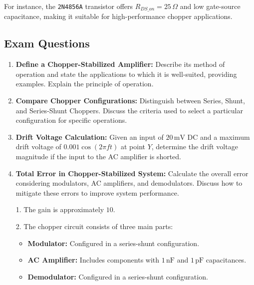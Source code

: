 \documentclass[a4paper,9pt,twoside,openany,twocolumn]{memoir}
\begin{document}
For instance, the \texttt{2N4856A} transistor offers \( R_{DS\_on} = 25\,\Omega \) and low gate-source capacitance, making it suitable for high-performance chopper applications.

\subsection{Exam Questions}
\begin{enumerate}
    \item \textbf{Define a Chopper-Stabilized Amplifier:} 
    Describe its method of operation and state the applications to which it is well-suited, providing examples. Explain the principle of operation.

    \item \textbf{Compare Chopper Configurations:} 
    Distinguish between Series, Shunt, and Series-Shunt Choppers. Discuss the criteria used to select a particular configuration for specific operations.

    \item \textbf{Drift Voltage Calculation:} 
    Given an input of \( 20 \, \text{mV DC} \) and a maximum drift voltage of \( 0.001 \cos(2\pi f t) \) at point \( Y \), determine the drift voltage magnitude if the input to the AC amplifier is shorted.
     \item \textbf{Total Error in Chopper-Stabilized System:} 
    Calculate the overall error considering modulators, AC amplifiers, and demodulators. Discuss how to mitigate these errors to improve system performance.

    \begin{tcolorbox}[
        colback=blue!5!white, 
        colframe=blue!75!black, 
        title=Hints, 
        boxrule=0.3mm, %
        sharp corners, %
        boxsep=1mm, %
        left=1mm, right=1mm, top=1mm, bottom=1mm, %
        before skip=2mm, %
        after skip=2mm,  %
        title style={font=\bfseries, align=left, size=\small}, %
        fontupper=\small %
    ]
    1. The gain is approximately \( 10 \).

    2. The chopper circuit consists of three main parts:
    \begin{itemize}[leftmargin=3mm, itemsep=0mm]
        \item \textbf{Modulator:} Configured in a series-shunt configuration.
        \item \textbf{AC Amplifier:} Includes components with \( 1\,\text{nF} \) and \( 1\,\text{pF} \) capacitances.
        \item \textbf{Demodulator:} Configured in a series-shunt configuration.
    \end{itemize}


\end{tcolorbox}
\end{enumerate}
\end{document}

